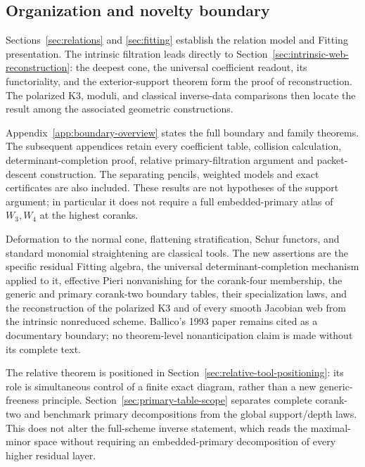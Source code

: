 \subsection{Organization and novelty boundary}

Sections~\ref{sec:relations} and \ref{sec:fitting} establish the
relation model and Fitting presentation.  The intrinsic filtration
leads directly to Section~\ref{sec:intrinsic-web-reconstruction}:
the deepest cone, the universal coefficient readout, its functoriality,
and the exterior-support theorem form the proof of reconstruction.
The polarized K3, moduli, and classical inverse-data comparisons then
locate the result among the associated geometric constructions.

Appendix~\ref{app:boundary-overview} states the full boundary and
family theorems.  The subsequent appendices retain every coefficient
table, collision calculation, determinant-completion proof, relative
primary-filtration argument and packet-descent construction.  The
separating pencils, weighted models and exact certificates are also
included.  These results are not hypotheses of the support argument;
in particular it does not require a full embedded-primary atlas of
\(W_3,W_4\) at the highest coranks.

Deformation to the normal cone, flattening stratification, Schur
functors, and standard monomial straightening are classical tools.
The new assertions are the specific residual Fitting algebra, the
universal determinant-completion mechanism applied to it, effective
Pieri nonvanishing for the corank-four membership, the generic and
primary corank-two boundary tables, their specialization laws, and
the reconstruction of the polarized K3 and of every smooth Jacobian
web from the intrinsic nonreduced scheme.  Ballico's 1993 paper remains cited as a documentary boundary;
no theorem-level nonanticipation claim is made without its complete
text.

The relative theorem is positioned in
Section~\ref{sec:relative-tool-positioning}: its role is simultaneous
control of a finite exact diagram, rather than a new generic-freeness
principle.  Section~\ref{sec:primary-table-scope} separates complete
corank-two and benchmark primary decompositions from the global
support/depth laws.  This does not alter the full-scheme inverse
statement, which reads the maximal-minor space without requiring an
embedded-primary decomposition of every higher residual layer.
